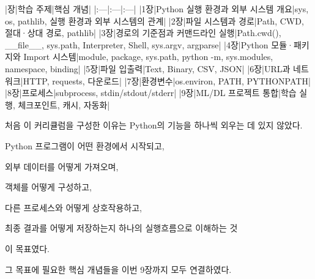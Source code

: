 \begin{dhktable}
|장|학습 주제|핵심 개념|
|:---|:---|:---|
|1장|Python 실행 환경과 외부 시스템 개요|sys, os, pathlib, 실행 환경과 외부 시스템의 관계|
|2장|파일 시스템과 경로|Path, CWD, 절대·상대 경로, pathlib|
|3장|경로의 기준점과 커맨드라인 실행|Path.cwd(), __file__, sys.path, Interpreter, Shell, sys.argv, argparse|
|4장|Python 모듈·패키지와 Import 시스템|module, package, sys.path, python -m, sys.modules, namespace, binding|
|5장|파일 입출력|Text, Binary, CSV, JSON|
|6장|URL과 네트워크|HTTP, requests, 다운로드|
|7장|환경변수|os.environ, PATH, PYTHONPATH|
|8장|프로세스|subprocess, stdin/stdout/stderr|
|9장|ML/DL 프로젝트 통합|학습 실행, 체크포인트, 캐시, 자동화|
\end{dhktable}

처음 이 커리큘럼을 구성한 이유는 Python의 기능을 하나씩 외우는 데 있지 않았다.

\begin{dhksmry}
    Python 프로그램이 어떤 환경에서 시작되고,

    외부 데이터를 어떻게 가져오며,

    객체를 어떻게 구성하고,

    다른 프로세스와 어떻게 상호작용하고,

    최종 결과를 어떻게 저장하는지 하나의 실행흐름으로 이해하는 것
\end{dhksmry}

이 목표였다.

그 목표에 필요한 핵심 개념들을 이번 9장까지 모두 연결하였다.